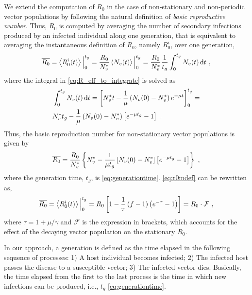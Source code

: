 We extend the computation of $R_0$ in the case of non-stationary and
non-periodic vector populations by following the natural definition of
\textit{basic reproductive number}. Thus, $R_0$ is computed by averaging the
number of  secondary infections produced by an infected individual along one
generation, that is equivalent to averaging the instantaneous definition of
$R_0$, namely $R_0^i$, over one generation,
\begin{equation}\label{eq:R_eff_to_integrate}
    \overline{R_0}=\left<R_0^i(t)\right>\Big\rvert_{0}^{t_g}=
    \frac{R_0}{N_v^*}\left<N_v(t)\right>\Big\rvert_{0}^{t_g}=
    \frac{R_0}{N_v^*}\frac{1}{t_g}\int_0^{t_g}N_v(t)
    \, \mathrm{d} t \ ,
\end{equation}
where the integral in \cref{eq:R_eff_to_integrate} is solved as
\begin{equation}
    \begin{aligned}
         & \int_0^{t_g}N_v(t) \, \mathrm{d} t=\left[N_v^*t
        -\frac{1}{\mu}\left(N_v(0)-N_v^*\right)e^{-\mu t}\right]_{0}^{t_g}=   \\
         & N_v^*t_g -\frac{1}{\mu}\left(N_v(0)-N_v^*\right)\left[e^{-\mu
                    t_g} - 1\right] \ .
    \end{aligned}
\end{equation}
Thus, the basic reproduction number for non-stationary vector populations
is given by
\begin{equation}
    \overline{R_0}=\frac{R_0}{N_v^*}\left\{N_v^*-\frac{1}{\mu
        t_g}\claudator{N_v(0)-N_v^*}\claudator{e^{-\mu t_g}-1}\right\} \ ,
    \label{eq:r0mdef}
\end{equation}
where the generation time, $t_g$, is \cref{eq:generationtime}.
\cref{eq:r0mdef} can be rewritten as,
\begin{equation}
    \overline{R_0}=\left<R_{0}^{i}(t)\right>\Big\rvert_{0}^{t_g}=
    R_0\left[1-\frac{1}{\tau}\left(f-1\right)
        \left(e^{-\tau}-1\right)\right]=R_0\cdot\mathcal{F}
    \ ,
    \label{eq:R0_non_stationary2}
\end{equation}
where $\tau=1+\mu/\gamma$ and $\mathcal{F}$ is the expression in brackets,
which accounts for the effect of the decaying vector population on the
stationary $R_0$.

In our approach, a generation is defined as the time elapsed in the
following sequence of processes: 1) A host individual becomes infected; 2) The
infected host passes the disease to a susceptible vector; 3) The infected
vector dies. Basically, the time elapsed from the first to the last process is
the time in which new infections can be produced, i.e., $t_g$
\cref{eq:generationtime}.

